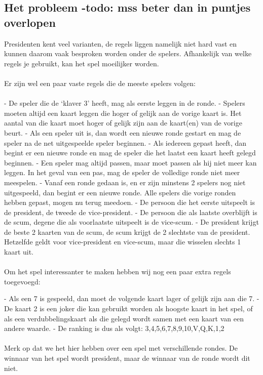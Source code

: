 \documentclass[11pt]{article}
\begin{document}
\subsection{Het probleem -todo: mss beter dan in puntjes overlopen}
Presidenten kent veel varianten, de regels liggen namelijk niet hard vast en kunnen daarom vaak besproken worden onder de spelers. Afhankelijk van welke regels je gebruikt, kan het spel moeilijker worden. \\\\Er zijn wel een paar vaste regels die de meeste spelers volgen:\\\\
- De speler die de ‘klaver 3’ heeft, mag als eerste leggen in de ronde. 
- Spelers moeten altijd een kaart leggen die hoger of gelijk aan de vorige kaart is. Het aantal van die kaart moet hoger of gelijk zijn aan de kaart(en) van de vorige beurt.
- Als een speler uit is, dan wordt een nieuwe ronde gestart en mag de speler na de net uitgespeelde speler beginnen.
- Als iedereen gepast heeft, dan begint er een nieuwe ronde en mag de speler die het laatst een kaart heeft gelegd beginnen.
- Een speler mag altijd passen, maar moet passen als hij niet meer kan leggen. In het geval van een pas, mag de speler de volledige ronde niet meer meespelen.
- Vanaf een ronde gedaan is, en er zijn minstens 2 spelers nog niet uitgespeeld, dan begint er een nieuwe ronde. Alle spelers die vorige ronden hebben gepast, mogen nu terug meedoen.
- De persoon die het eerste uitspeelt is de president, de tweede de vice-president. 
- De persoon die als laatste overblijft is de scum, degene die als voorlaatste uitspeelt is de vice-scum.
- De president krijgt de beste 2 kaarten van de scum, de scum krijgt de 2 slechtste van de president. Hetzelfde geldt voor vice-president en vice-scum, maar die wisselen slechts 1 kaart uit.\\\\
Om het spel interessanter te maken hebben wij nog een paar extra regels toegevoegd:

- Als een 7 is gespeeld, dan moet de volgende kaart lager of gelijk zijn aan die 7.
- De kaart 2 is een joker die kan gebruikt worden als hoogste kaart in het spel, of als een verdubbelingskaart als die gelegd wordt samen met een kaart van een andere waarde.
- De ranking is dus als volgt: 3,4,5,6,7,8,9,10,V,Q,K,1,2
\\\\
Merk op dat we het hier hebben over een spel met verschillende rondes. De winnaar van het spel wordt president, maar de winnaar van de ronde wordt dit niet. 
\end{document}
